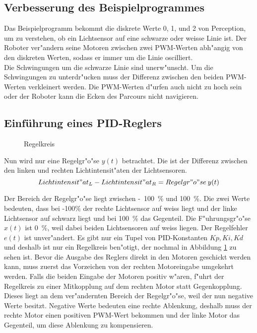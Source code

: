 \subsection{Verbesserung des Beispielprogrammes}

Das Beispielprogramm bekommt die diskrete Werte 0, 1, und 2 von Perception, um zu verstehen, ob ein Lichtsensor auf eine schwarze oder weisse Linie ist. Der Roboter ver"andern seine Motoren zwischen zwei PWM-Werten abh"angig von den diskreten Werten, sodass er immer um die Linie oscilliert. \\

Die Schwingungen um die schwarze Linie sind unerw"unscht. Um die Schwingungen zu unterdr"ucken muss der Differenz zwischen den beiden PWM-Werten verkleinert werden. Die PWM-Werten d"urfen auch nicht zu hoch sein oder der Roboter kann die Ecken des Parcours nicht navigieren.

\subsection{Einf\"uhrung eines PID-Reglers}

\begin{figure}
    \centering
    
    \caption{Regelkreis}
    \label{fig:regelkreis}
\end{figure}

Nun wird nur eine Regelgr"o"se \(y(t)\) betrachtet. Die ist der Differenz zwischen den linken und rechten Lichtintensit"aten der Lichtsensoren.
\begin{equation}
    Lichtintensit"at_L - Lichtintensit"at_R = Regelgr"o"se \: y(t)
\end{equation}

 Der Bereich der Regelgr"o"se liegt zwischen \si{-100\percent} und \si{100\percent}. Die zwei Werte bedeuten, dass bei -100\% der rechte Lichtsensor auf weiss liegt und der linke Lichtsensor auf schwarz liegt und bei \si{100\percent} das Gegenteil. Die F"uhrungsgr"o"se \(x(t)\) ist \si{0\percent}, weil dabei beiden Lichtsensoren auf weiss liegen. Der Regelfehler \(e(t)\) ist unver"andert. Es gibt nur ein Tupel von PID-Konstanten \({Kp,Ki,Kd}\) und deshalb ist nur ein Regelkreis ben"otigt, der nochmal in Abbildung \ref{fig:regelkreis} zu sehen ist. Bevor die Ausgabe des Reglers direkt in den Motoren geschickt werden kann, muss zuerst das Vorzeichen von der rechten Motoreingabe umgekehrt werden. Falls die beiden Eingabe der Motoren positiv w"aren, f"uhrt der Regelkreis zu einer Mitkopplung auf dem rechten Motor statt Gegenkopplung. Dieses liegt an dem ver"andernten Bereich der Regelgr"o"se, weil der nun negative Werte besitzt. Negative Werte bedeuten eine rechte Ablenkung, deshalb muss der rechte Motor einen positiven PWM-Wert bekommen und der linke Motor das Gegenteil, um diese Ablenkung zu kompensieren. \\

